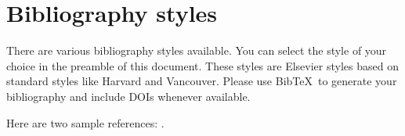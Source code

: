 \documentclass[review]{elsarticle}
\begin{document}
\section{Bibliography styles}

There are various bibliography styles available. You can select the style of your choice in the preamble of this document. These styles are Elsevier styles based on standard styles like Harvard and Vancouver. Please use Bib\TeX\ to generate your bibliography and include DOIs whenever available.

Here are two sample references: \cite{Feynman1963118,Dirac1953888}.



\end{document}
